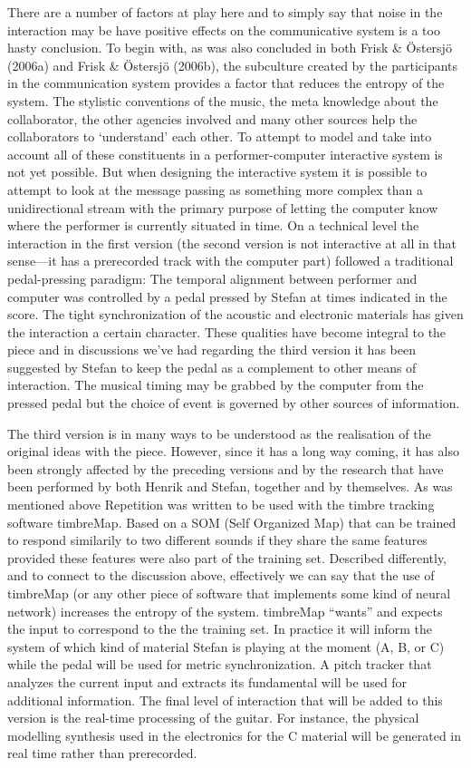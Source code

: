There are a number of factors at play here and to simply say that
noise in the interaction may be have positive effects on the
communicative system is a too hasty conclusion. To begin with, as was
also concluded in both Frisk \& \"{O}stersj\"{o} (2006a) and Frisk \&
\"{O}stersj\"{o} (2006b), the subculture created by the participants
in the communication system provides a factor that reduces the entropy
of the system. The stylistic conventions of the music, the meta
knowledge about the collaborator, the other agencies involved and many
other sources help the collaborators to `understand' each other. To
attempt to model and take into account all of these constituents in a
performer-computer interactive system is not yet possible. But when
designing the interactive system it is possible to attempt to look at
the message passing as something more complex than a unidirectional
stream with the primary purpose of letting the computer know where the
performer is currently situated in time. On a technical level the
interaction in the first version (the second version is not
interactive at all in that sense---it has a prerecorded track with the
computer part) followed a traditional pedal-pressing paradigm: The
temporal alignment between performer and computer was controlled by a
pedal pressed by Stefan at times indicated in the score. The tight
synchronization of the acoustic and electronic materials has given the
interaction a certain character. These qualities have become integral
to the piece and in discussions we've had regarding the third version
it has been suggested by Stefan to keep the pedal as a complement to
other means of interaction. The musical timing may be grabbed by the
computer from the pressed pedal but the choice of event is governed by
other sources of information.

The third version is in many ways to be understood as the realisation
of the original ideas with the piece. However, since it has a long way
coming, it has also been strongly affected by the preceding versions
and by the research that have been performed by both Henrik and
Stefan, together and by themselves. As was mentioned above Repetition
was written to be used with the timbre tracking software
timbreMap. Based on a SOM (Self Organized Map) that can be trained to
respond similarily to two different sounds if they share the same
features provided these features were also part of the training
set. Described differently, and to connect to the discussion above,
effectively we can say that the use of timbreMap (or any other piece
of software that implements some kind of neural network) increases the
entropy of the system. timbreMap ``wants'' and expects the input to
correspond to the the training set. In practice it will inform the
system of which kind of material Stefan is playing at the moment (A,
B, or C) while the pedal will be used for metric synchronization. A
pitch tracker that analyzes the current input and extracts its
fundamental will be used for additional information. The final level
of interaction that will be added to this version is the real-time
processing of the guitar. For instance, the physical modelling
synthesis used in the electronics for the C material will be generated
in real time rather than prerecorded.


